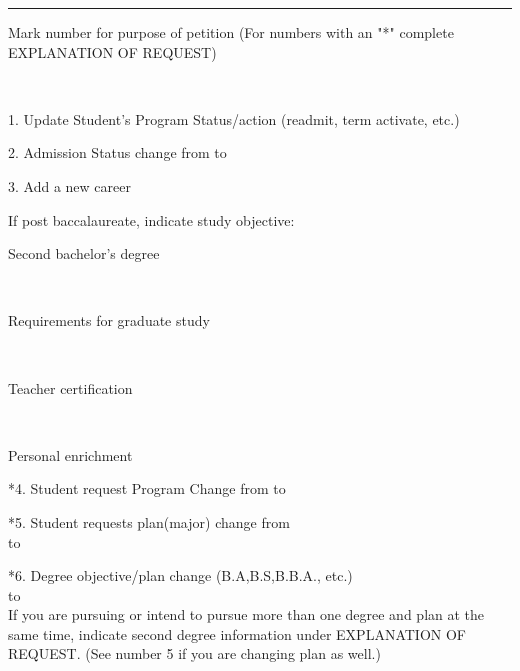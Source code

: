 \documentclass{article}
\begin{document}
\begin{Form}
\begin{multicols}{2}
\end{multicols}

\vspace{-3mm}
\noindent\rule{32cm}{0.01pt}

Mark number for purpose of petition (For numbers with an "*" complete EXPLANATION OF REQUEST)


\begin{multicols}{3}

\
\parbox{.9\columnwidth}{

    1. Update Student's Program Status/action (readmit, term activate, etc.) \TextField[name=update, width=2.5cm]{}
    
    2. Admission Status change from \TextField[name=status1, width=1.5cm]{} to \TextField[name=status2, width=1.5cm]{}
    
    3. Add a new career \TextField[name=career, width=5.5cm]{}
        
    \hspace{0.5cm}If post baccalaureate, indicate study objective:
    
        \parbox{9cm}{\hspace{1cm}Second bachelor's degree}\\
        \parbox{9cm}{\hspace{1cm}Requirements for graduate study}\\
        \parbox{9cm}{\hspace{1cm}Teacher certification}\\
        \parbox{9cm}{\hspace{1cm}Personal enrichment}
    
    *4. Student request Program Change from \TextField[name=change1, width=2cm]{} to \TextField[name=change2, width=2cm]{}

    }

\columnbreak
\parbox{0.9\columnwidth}{
    *5. Student requests plan(major) change from \\ \TextField[name=major1, width=3cm]{} to \TextField[name=major2, width=3cm]{}
    
    *6. Degree objective/plan change (B.A,B.S,B.B.A., etc.) \\ \TextField[name=plan1, width=2cm]{} to \TextField[name=plan2, width=2cm]{}\\
    \footnotesize If you are pursuing or intend to pursue more than one degree and plan at the same time, indicate second degree information under EXPLANATION OF REQUEST. (See number 5 if you are changing plan as well.)
    
}
\end{multicols}
\end{Form}
\end{document}

